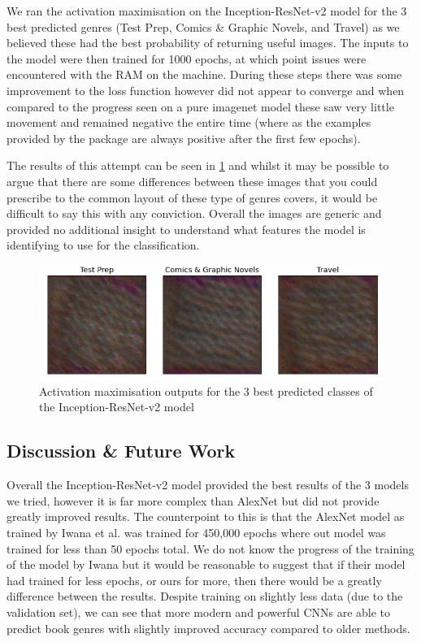 \documentclass[12pt]{article}
\numberwithin{equation}{section}
\numberwithin{figure}{section}
\begin{document}
We ran the activation maximisation on the Inception-ResNet-v2 model for the 3 best predicted genres (Test Prep, Comics \& Graphic Novels, and Travel) as we believed these had the best probability of returning useful images. The inputs to the model were then trained for 1000 epochs, at which point issues were encountered with the RAM on the machine. During these steps there was some improvement to the loss function however did not appear to converge and when compared to the progress seen on a pure imagenet model these saw very little movement and remained negative the entire time (where as the examples provided by the package are always positive after the first few epochs). 

The results of this attempt can be seen in \cref{fig:act_max_output} and whilst it may be possible to argue that there are some differences between these images that you could prescribe to the common layout of these type of genres covers, it would be difficult to say this with any conviction. Overall the images are generic and provided no additional insight to understand what features the model is identifying to use for the classification.

\begin{figure}
	\centering
	\captionsetup{justification=centering}
	\includegraphics[scale=0.6]{visualize-dense-layer.png}
	\caption{Activation maximisation outputs for the 3 best predicted classes of the Inception-ResNet-v2 model}
	\label{fig:act_max_output}
\end{figure}

\subsection{Discussion \& Future Work} 
\label{sub:Discussion} 
Overall the Inception-ResNet-v2 model provided the best results of the 3 models we tried, however it is far more complex than AlexNet but did not provide greatly improved results. The counterpoint to this is that the AlexNet model as trained by Iwana et al. was trained for 450,000 epochs where out model was trained for less than 50 epochs total. We do not know the progress of the training of the model by Iwana but it would be reasonable to suggest that if their model had trained for less epochs, or ours for more, then there would be a greatly difference between the results. Despite training on slightly less data (due to the validation set), we can see that more modern and powerful CNNs are able to predict book genres with slightly improved accuracy compared to older methods.
\end{document}
